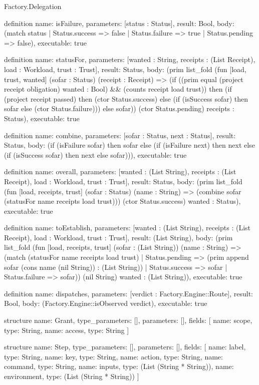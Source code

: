 \begin{lexlean}{Factory.Delegation}
\begin{semanticmodule}
definition{
  name: isFailure,
  parameters: [status : Status],
  result: Bool,
  body: (match status
    | Status.success => false
    | Status.failure => true
    | Status.pending => false),
  executable: true
}

definition{
  name: statusFor,
  parameters: [wanted : String, receipts : (List Receipt), load : Workload, trust : Trust],
  result: Status,
  body: (prim list_fold (fun [load, trust, wanted] (sofar : Status) (receipt : Receipt) => (if ((prim equal (project receipt obligation) wanted : Bool) && (counts receipt load trust)) then (if (project receipt passed) then (ctor Status.success) else (if (isSuccess sofar) then sofar else (ctor Status.failure))) else sofar)) (ctor Status.pending) receipts : Status),
  executable: true
}

definition{
  name: combine,
  parameters: [sofar : Status, next : Status],
  result: Status,
  body: (if (isFailure sofar) then sofar else (if (isFailure next) then next else (if (isSuccess sofar) then next else sofar))),
  executable: true
}

definition{
  name: overall,
  parameters: [wanted : (List String), receipts : (List Receipt), load : Workload, trust : Trust],
  result: Status,
  body: (prim list_fold (fun [load, receipts, trust] (sofar : Status) (name : String) => (combine sofar (statusFor name receipts load trust))) (ctor Status.success) wanted : Status),
  executable: true
}

definition{
  name: toEstablish,
  parameters: [wanted : (List String), receipts : (List Receipt), load : Workload, trust : Trust],
  result: (List String),
  body: (prim list_fold (fun [load, receipts, trust] (sofar : (List String)) (name : String) => (match (statusFor name receipts load trust)
      | Status.pending => (prim append sofar (cons name (nil String)) : (List String))
      | Status.success => sofar
      | Status.failure => sofar)) (nil String) wanted : (List String)),
  executable: true
}

definition{
  name: dispatches,
  parameters: [verdict : Factory.Engine::Route],
  result: Bool,
  body: (Factory.Engine::isObserved verdict),
  executable: true
}

structure{
  name: Grant,
  type_parameters: [],
  parameters: [],
  fields: [
    {name: scope, type: String},
    {name: access, type: String}
  ]
}

structure{
  name: Step,
  type_parameters: [],
  parameters: [],
  fields: [
    {name: label, type: String},
    {name: key, type: String},
    {name: action, type: String},
    {name: command, type: String},
    {name: inputs, type: (List (String * String))},
    {name: environment, type: (List (String * String))}
  ]
}


\end{semanticmodule}
\end{lexlean}
